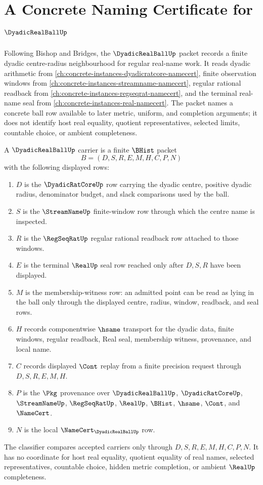 \chapter{A Concrete Naming Certificate for $\DyadicRealBallUp$}
\label{ch:concrete-instances-dyadic-real-ball-namecert}

Following Bishop and Bridges, the $\DyadicRealBallUp$ packet records a finite dyadic centre-radius neighbourhood for regular real-name work. It reads dyadic arithmetic from \autoref{ch:concrete-instances-dyadicratcore-namecert}, finite observation windows from \autoref{ch:concrete-instances-streamname-namecert}, regular rational readback from \autoref{ch:concrete-instances-regseqrat-namecert}, and the terminal real-name seal from \autoref{ch:concrete-instances-real-namecert}. The packet names a concrete ball row available to later metric, uniform, and completion arguments; it does not identify host real equality, quotient representatives, selected limits, countable choice, or ambient completeness.

\begin{definition}
\label{def:dyadic-real-ball-carrier}
A $\DyadicRealBallUp$ carrier is a finite $\BHist$ packet
$$
B=(D,S,R,E,M,H,C,P,N)
$$
with the following displayed rows:
\begin{enumerate}
\item $D$ is the $\DyadicRatCoreUp$ row carrying the dyadic centre, positive dyadic radius, denominator budget, and slack comparisons used by the ball.
\item $S$ is the $\StreamNameUp$ finite-window row through which the centre name is inspected.
\item $R$ is the $\RegSeqRatUp$ regular rational readback row attached to those windows.
\item $E$ is the terminal $\RealUp$ seal row reached only after $D,S,R$ have been displayed.
\item $M$ is the membership-witness row: an admitted point can be read as lying in the ball only through the displayed centre, radius, window, readback, and seal rows.
\item $H$ records componentwise $\hsame$ transport for the dyadic data, finite windows, regular readback, Real seal, membership witness, provenance, and local name.
\item $C$ records displayed $\Cont$ replay from a finite precision request through $D,S,R,E,M,H$.
\item $P$ is the $\Pkg$ provenance over $\DyadicRealBallUp$, $\DyadicRatCoreUp$, $\StreamNameUp$, $\RegSeqRatUp$, $\RealUp$, $\BHist$, $\hsame$, $\Cont$, and $\NameCert$.
\item $N$ is the local $\NameCert_{\DyadicRealBallUp}$ row.
\end{enumerate}
The classifier compares accepted carriers only through $D,S,R,E,M,H,C,P,N$. It has no coordinate for host real equality, quotient equality of real names, selected representatives, countable choice, hidden metric completion, or ambient $\RealUp$ completeness.
\end{definition}

